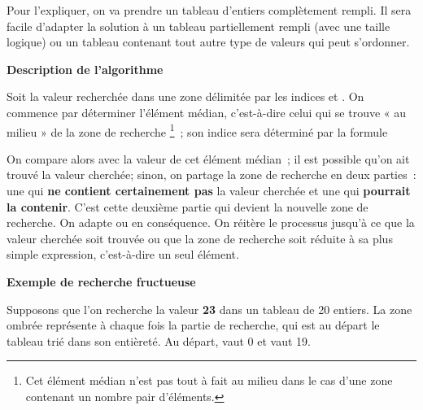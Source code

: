 		Pour l’expliquer,
		on va prendre un tableau d’entiers complètement rempli.
		Il sera facile d’adapter la solution à un tableau partiellement
		rempli (avec une taille logique) 
		ou un tableau contenant tout autre type de valeurs
		qui peut s’ordonner.
		
		{\sffamily\bfseries\upshape
		Description de l’algorithme}
	
		Soit  la valeur recherchée dans une zone délimitée 
		par les indices  et . 
		On commence par déterminer l’élément médian, 
		c’est-à-dire celui qui se trouve « au milieu » 
		de la zone de recherche%
		\footnote{%
			Cet élément médian n’est pas tout à fait au milieu 
			dans le cas d’une zone contenant un nombre pair d’éléments.
		}~; 
		son indice sera déterminé par la formule
	
		{\centering
		\par{}
		}
	
		On compare alors  avec la valeur de cet élément médian~; 
		il est possible qu’on ait trouvé la valeur cherchée; 
		sinon, on partage la zone de recherche en deux parties~: 
		une qui \textbf{ne contient certainement pas} la valeur cherchée 
		et une qui \textbf{pourrait la contenir}. 
		C’est cette deuxième partie qui devient la nouvelle zone de recherche. 
		On adapte  ou  en conséquence.
		On réitère le processus jusqu’à ce que la valeur cherchée soit trouvée ou
		que la zone de recherche soit réduite à sa plus simple expression,
		c’est-à-dire un seul élément.
			
		{\sffamily\bfseries\upshape
		Exemple de recherche fructueuse}

		Supposons que l’on recherche la valeur \textbf{23} 
		dans un tableau de 20 entiers. 
		La zone ombrée représente à chaque fois la partie de recherche, 
		qui est au départ le tableau trié dans son entièreté.
		Au départ,
		 vaut 0 et
		 vaut 19.

